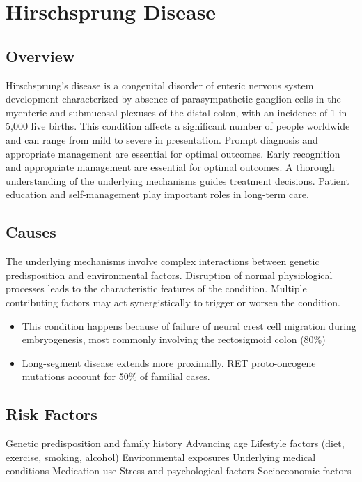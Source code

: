 \chapter{Hirschsprung Disease}
\label{sec:Hirschsprung Disease}

\section{Overview}
Hirschsprung's disease is a congenital disorder of enteric nervous system development characterized by absence of parasympathetic ganglion cells in the myenteric and submucosal plexuses of the distal colon, with an incidence of 1 in 5,000 live births. This condition affects a significant number of people worldwide and can range from mild to severe in presentation. Prompt diagnosis and appropriate management are essential for optimal outcomes. Early recognition and appropriate management are essential for optimal outcomes. A thorough understanding of the underlying mechanisms guides treatment decisions. Patient education and self-management play important roles in long-term care.
\section{Causes}
The underlying mechanisms involve complex interactions between genetic predisposition and environmental factors. Disruption of normal physiological processes leads to the characteristic features of the condition. Multiple contributing factors may act synergistically to trigger or worsen the condition.

\begin{itemize}[noitemsep]
  \item This condition happens because of failure of neural crest cell migration during embryogenesis, most commonly involving the rectosigmoid colon (80\%)
  \item Long-segment disease extends more proximally. RET proto-oncogene mutations account for 50\% of familial cases.
\end{itemize}
\section{Risk Factors}
Genetic predisposition and family history Advancing age Lifestyle factors (diet, exercise, smoking, alcohol) Environmental exposures Underlying medical conditions Medication use Stress and psychological factors Socioeconomic factors


